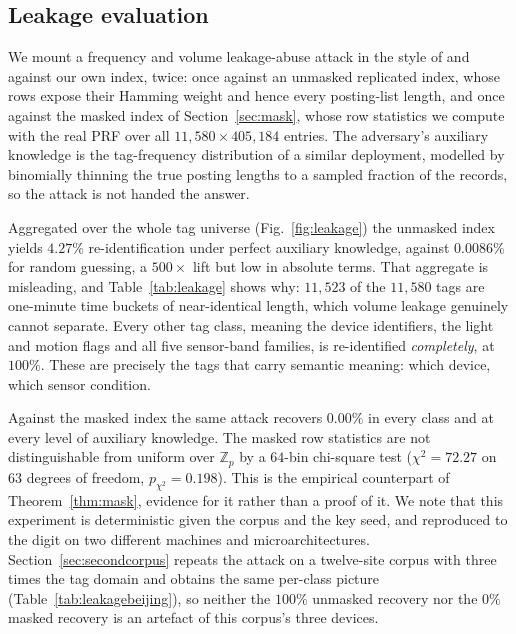 \documentclass[a4paper,fleqn]{cas-dc}
\begin{document}
\subsection{Leakage evaluation}
\label{sec:leakeval}
We mount a frequency and volume leakage-abuse attack in the style of
\citet{islam2012access} and \citet{cash2015leakage} against our own index,
twice: once against an unmasked replicated index, whose rows expose their
Hamming weight and hence every posting-list length, and once against the
masked index of Section~\ref{sec:mask}, whose row statistics we compute with
the real PRF over all $11{,}580\times405{,}184$ entries. The adversary's
auxiliary knowledge is the tag-frequency distribution of a similar deployment,
modelled by binomially thinning the true posting lengths to a sampled fraction
of the records, so the attack is not handed the answer.

Aggregated over the whole tag universe (Fig.~\ref{fig:leakage}) the unmasked
index yields $4.27\%$ re-identification under perfect auxiliary knowledge,
against $0.0086\%$ for random guessing, a $500\times$ lift but low in absolute
terms. That aggregate is misleading, and Table~\ref{tab:leakage} shows why:
$11{,}523$ of the $11{,}580$ tags are one-minute time buckets of near-identical
length, which volume leakage genuinely cannot separate. Every other tag class,
meaning the device identifiers, the light and motion flags and all five
sensor-band families, is re-identified \emph{completely}, at $100\%$. These
are precisely the tags that carry semantic meaning: which device, which sensor
condition.

Against the masked index the same attack recovers $0.00\%$ in every class and
at every level of auxiliary knowledge. The masked row statistics are not
distinguishable from uniform over $\mathbb{Z}_p$ by a $64$-bin chi-square test
($\chi^2=72.27$ on $63$ degrees of freedom, $p_{\chi^2}=0.198$). This is the
empirical counterpart of Theorem~\ref{thm:mask}, evidence for it rather than a
proof of it. We note that this experiment is deterministic given the corpus
and the key seed, and reproduced to the digit on two different machines and
microarchitectures. Section~\ref{sec:secondcorpus} repeats the attack on a
twelve-site corpus with three times the tag domain and obtains the same
per-class picture (Table~\ref{tab:leakagebeijing}), so neither the $100\%$
unmasked recovery nor the $0\%$ masked recovery is an artefact of this
corpus's three devices.
\end{document}
